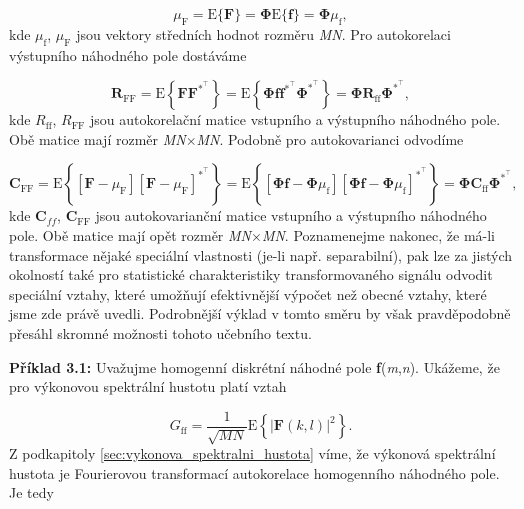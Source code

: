 \begin{equation} \label{eq:3_30}
    \mu_{\mathrm{F}} = \mathrm{E} \{ \mathbf{F} \} = \mathbf{\Phi} \mathrm{E} \{ \mathbf{f} \} = \mathbf{\Phi} \mu_{\mathrm{f}},
\end{equation}
kde $\mu_{\mathrm{f}}$, $\mu_{\mathrm{F}}$ jsou vektory středních hodnot rozměru \textit{MN}. Pro autokorelaci výstupního náhodného pole dostáváme

\begin{equation} \label{eq:3_31}
    \mathbf{R}_{\mathrm{FF}} = \mathrm{E} \left\{ \mathbf{F} \mathbf{F}^{*^{\top}}\right\} = \mathrm{E} \left\{ \mathbf{\Phi} \mathbf{f} \mathbf{f}^{*^{\top}} \mathbf{\Phi}^{*^{\top}} \right\} = \mathbf{\Phi} \mathbf{R}_{\mathrm{ff}} \mathbf{\Phi}^{*^{\top}},
\end{equation}
kde $R_{\mathrm{ff}}$, $R_{\mathrm{FF}}$ jsou autokorelační matice vstupního a výstupního náhodného pole. Obě matice mají rozměr \textit{MN}$\times$\textit{MN}. Podobně pro autokovarianci odvodíme

\begin{equation} \label{eq:3_32}
    \mathbf{C}_{\mathrm{FF}} = \mathrm{E} \left\{ \left[ \mathbf{F} - \mu_{\mathrm{F}} \right] \left[ \mathbf{F} - \mu_{\mathrm{F}} \right]^{*^{\top}} \right\} = \mathrm{E} \left\{ \left[ \mathbf{\Phi} \mathbf{f} - \mathbf{\Phi} \mu_\mathrm{f} \right] \left[ \mathbf{\Phi} \mathbf{f} - \mathbf{\Phi}\mu_\mathrm{f} \right]^{*^{\top}} \right\} = \mathbf{\Phi} \mathbf{C}_{\mathrm{ff}} \mathbf{\Phi}^{*^{\top}},
\end{equation}
kde \textbf{C}$_{ff}$, \textbf{C}$_{\mathrm{FF}}$ jsou autokovarianční matice vstupního a výstupního náhodného pole. Obě matice mají opět rozměr \textit{MN}$\times$\textit{MN}. Poznamenejme nakonec, že má-li transformace nějaké speciální vlastnosti (je-li např. separabilní), pak lze za jistých okolností také pro statistické charakteristiky transformovaného signálu odvodit speciální vztahy, které umožňují efektivnější výpočet než obecné vztahy, které jsme zde právě uvedli. Podrobnější výklad v tomto směru by však pravděpodobně přesáhl skromné možnosti tohoto učebního textu.

\noindent \textbf{Příklad 3.1:} Uvažujme homogenní diskrétní náhodné pole \textbf{f}(\textit{m},\textit{n}). Ukážeme, že pro výkonovou spektrální hustotu platí vztah

\begin{equation}
    G_{\mathrm{ff}} = \frac{1}{\sqrt{MN}} \mathrm{E} \left\{ \left| \mathbf{F}(k, l) \right|^2 \right\}.\nonumber
\end{equation}
Z podkapitoly \ref{sec:vykonova_spektralni_hustota} víme, že výkonová spektrální hustota je Fourierovou transformací autokorelace  homogenního náhodného pole. Je tedy

